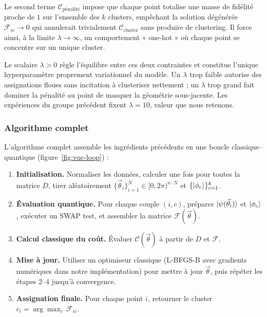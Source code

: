 \documentclass[a4paper]{article}
\begin{document}
Le second terme $\mathcal{C}_{\text{pénalité}}$ impose que chaque point totalise une masse de fidélité proche de $1$ sur l'ensemble des $k$ clusters, empêchant la solution dégénérée $\mathcal{F}_{ic} \to 0$ qui annulerait trivialement $\mathcal{C}_{\text{cluster}}$ sans produire de clustering. Il force ainsi, à la limite $\lambda \to \infty$, un comportement « one-hot » où chaque point se concentre sur un unique cluster.

Le scalaire $\lambda > 0$ règle l'équilibre entre ces deux contraintes et constitue l'unique hyperparamètre proprement variationnel du modèle. Un $\lambda$ trop faible autorise des assignations floues sans incitation à clusteriser nettement ; un $\lambda$ trop grand fait dominer la pénalité au point de masquer la géométrie sous-jacente. Les expériences du groupe précédent fixent $\lambda = 10$, valeur que nous retenons.

\subsubsection*{Algorithme complet}

L'algorithme complet assemble les ingrédients précédents en une boucle classique–quantique (figure~\ref{fig:vqc-loop}) :
\begin{enumerate}
    \item \textbf{Initialisation.} Normaliser les données, calculer une fois pour toutes la matrice $D$, tirer aléatoirement $\{\vec{\theta}_i\}_{i=1}^N \in [0,2\pi)^{n \cdot N}$ et $\{\ket{\phi_c}\}_{c=1}^k$.
    \item \textbf{Évaluation quantique.} Pour chaque couple $(i,c)$, préparer $\ket{\psi(\vec{\theta}_i)}$ et $\ket{\phi_c}$, exécuter un SWAP test, et assembler la matrice $\mathcal{F}(\vec{\theta})$.
    \item \textbf{Calcul classique du coût.} Évaluer $\mathcal{C}(\vec{\theta})$ à partir de $D$ et $\mathcal{F}$.
    \item \textbf{Mise à jour.} Utiliser un optimiseur classique (L-BFGS-B avec gradients numériques dans notre implémentation) pour mettre à jour $\vec{\theta}$, puis répéter les étapes 2–4 jusqu'à convergence.
    \item \textbf{Assignation finale.} Pour chaque point $i$, retourner le cluster $c_i = \arg\max_{c}\, \mathcal{F}_{ic}$.
\end{enumerate}
\end{document}
